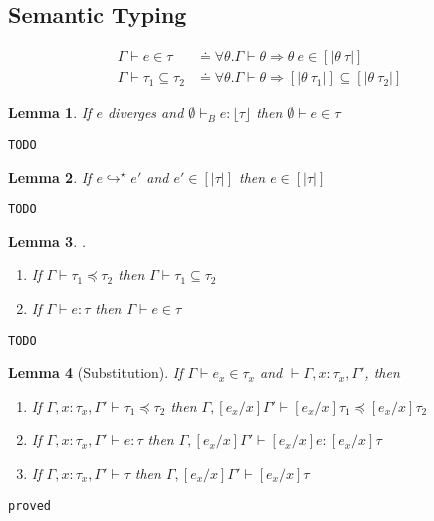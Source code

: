 \documentclass[10pt,a4paper]{article}
\newtheorem{lemma}{Lemma}
\newcommand\showproof[1]{\texttt{proved}}
\newcommand\showprooftodo[1]{\texttt{TODO}}
\newcommand\sub[2]{\ensuremath{\left[ #2 / #1 \right]}}
\newcommand\erase[1]{\ensuremath{\lfloor #1 \rfloor}}
\newcommand\interp[1]{\ensuremath{[|#1|]}}
\newcommand\evals[2]{\ensuremath{#1 \hookrightarrow^\star #2}}
\newcommand\hastype[3]{\ensuremath{#1 \vdash #2 : #3}}
\newcommand\hastypebase[3]{\ensuremath{#1 \vdash_B #2 : #3}}
\newcommand\shastype[3]{\ensuremath{#1 \vdash #2 \in #3}}
\newcommand\iswellformed[2]{\ensuremath{#1 \vdash #2}}
\newcommand\issubtype[3]{\ensuremath{#1 \vdash #2 \preceq #3}}
\newcommand\sissubtype[3]{\ensuremath{#1 \vdash #2 \subseteq #3}}
\begin{document}
\subsection{Semantic Typing}
\begin{align*}
\shastype{\Gamma}{e}{\tau} & \doteq
	\forall \theta . \iswellformed{\Gamma}{\theta} \Rightarrow \theta\ e \in \interp{\theta \ \tau}\\
\sissubtype{\Gamma}{\tau_1}{\tau_2} & \doteq 
	\forall \theta . \iswellformed{\Gamma}{\theta} \Rightarrow \interp{\theta\ \tau_1} \subseteq \interp{\theta\ \tau_2}
\end{align*}

\begin{lemma}\label{lemma:sevals}
If $e$ diverges and \hastypebase{\emptyset}{e}{\erase{\tau}} 
then \shastype{\emptyset}{e}{\tau}
\end{lemma}
\showprooftodo{
}


\begin{lemma}\label{lemma:sevals}
If \evals{e}{e'} and ${e'}\in{\interp{\tau}}$ 
then ${e}\in{\interp{\tau}}$
\end{lemma}
\showprooftodo{
	\begin{proof}
	
	\end{proof}
}

\begin{lemma}.
\begin{enumerate}
\item If \issubtype{\Gamma}{\tau_1}{\tau_2} then \sissubtype{\Gamma}{\tau_1}{\tau_2} 
\item If \hastype{\Gamma}{e}{\tau} then \shastype{\Gamma}{e}{\tau} 
\end{enumerate}
\end{lemma}
\showprooftodo{
	\begin{proof}
	
	\end{proof}
}


\begin{lemma}[Substitution]\label{lemma:substitution}
If \shastype{\Gamma}{e_x}{\tau_x} and \iswellformed{}{\Gamma, x\colon\tau_x ,\Gamma'}, then 
\begin{enumerate}
\item If 
	\issubtype{\Gamma, x\colon\tau_x, \Gamma'}{\tau_1}{\tau_2}
	then
	\issubtype{\Gamma, \sub{x}{e_x}\Gamma'}{\sub{x}{e_x}\tau_1}{\sub{x}{e_x}\tau_2}
\item If 
	\hastype{\Gamma, x\colon\tau_x, \Gamma'}{e}{\tau}
	then
	\hastype{\Gamma, \sub{x}{e_x}\Gamma'}{\sub{x}{e_x}e}{\sub{x}{e_x}\tau}
\item If 
	\iswellformed{\Gamma, x\colon\tau_x, \Gamma'}{\tau}
	then
	\iswellformed{\Gamma, \sub{x}{e_x}\Gamma'}{\sub{x}{e_x}\tau}
\end{enumerate}
\end{lemma}
\showproof{
	\begin{proof}
	
	\end{proof}
}
\end{document}
